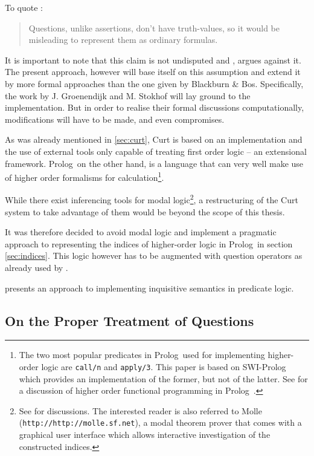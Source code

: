 \documentclass[12pt,a4paper]{article}
\newcommand{\code}{\texttt} %
\newcommand{\pn}{\textsf} %
\newcommand{\url}[1]{\code{http://#1}} %
\newcommand{\prol}{\pn{Prolog}\mbox{ }}
\theoremstyle{remark} \newtheorem*{termin}{Terminology} %
\begin{document}
To quote \cite{blackburnbos:cl1}:

\begin{quote}
  Questions, unlike assertions, don't have truth-values, so it would be
  misleading to represent them as ordinary formulas.
\end{quote}

It is important to note that this claim is not undisputed and
\cite{karttunen:1977}, argues against it. The present approach, however will
base itself on this assumption and extend it by more formal approaches than the
one given by Blackburn \& Bos. Specifically, the work by J. Groenendijk and M. Stokhof
will lay ground to the implementation. But in order to realise their formal
discussions computationally, modifications will have to be made, and even
compromises.

As was already mentioned in \ref{sec:curt}, Curt is based on an
implementation and the use of external tools only capable of treating first
order logic – an extensional framework. \prol on the other hand, is a language
that can very well make use of higher order formalisms for
calculation\footnote{The two most popular predicates in \prol used for
implementing higher-order logic are
\code{call/n} and \code{apply/3}. This paper is based on \pn{SWI-Prolog} which
provides an implementation of the former, but not of the latter. See
\cite{naish:prolhio} for a discussion of higher order functional programming in
\prol.}.

While there exist inferencing tools for modal logic\footnote{See %
for discussions. The interested reader is also referred to \pn{Molle}
(\url{http://molle.sf.net}), a modal theorem prover that comes with a graphical user
interface which allows interactive investigation of the constructed indices.},
a restructuring of the \pn{Curt} system to take advantage of them would be
beyond the scope of this thesis.

It was therefore decided to avoid modal logic and implement a pragmatic approach
to representing the indices of higher-order logic in \prol in section
\ref{sec:indices}. This logic however has to be augmented with question
operators as already used by \cite{karttunen:1977}. %

\cite{g:is} presents an approach to implementing inquisitive semantics in
predicate logic.

\subsection{On the Proper Treatment of Questions}
\end{document}

